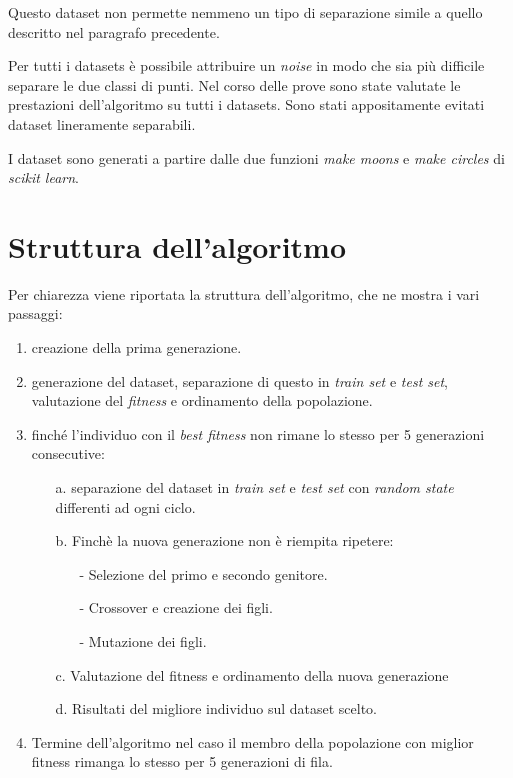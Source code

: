 \documentclass[12pt,a4paper]{report}
\begin{document}
Questo dataset non permette nemmeno un tipo di separazione simile a quello descritto nel paragrafo precedente.

Per tutti i datasets è possibile attribuire un \textit{noise} in modo che sia più difficile separare le due classi di punti.
Nel corso delle prove sono state valutate le prestazioni dell'algoritmo su tutti i datasets.
Sono stati appositamente evitati dataset lineramente separabili.

I dataset sono generati a partire dalle due funzioni \textit{make moons} e \textit{make circles} di \textit{scikit learn}.


\section{Struttura dell'algoritmo }

Per chiarezza viene riportata la struttura dell'algoritmo, che ne mostra i vari passaggi:

\begin{enumerate}
 \item creazione della prima generazione.
 \item generazione del dataset, separazione di questo in \textit{train set} e \textit{test set}, valutazione del \textit{fitness} e ordinamento della popolazione.
 \item finché l'individuo con il \textit{best fitness} non rimane lo stesso per 5 generazioni consecutive:
 \begin{enumerate}
  \item[a.] separazione del dataset in \textit{train set} e \textit{test set} con \textit{random state} differenti ad ogni ciclo.
  \item[b.] Finchè la nuova generazione non è riempita ripetere:
  \begin{enumerate}
   \item [-] Selezione del primo e secondo genitore.
   \item [-] Crossover e creazione dei figli.
   \item [-] Mutazione dei figli.
  \end{enumerate}
  \item [c.] Valutazione del fitness e ordinamento della nuova generazione
  \item [d.] Risultati del migliore individuo sul dataset scelto.
 \end{enumerate}
 \item Termine dell'algoritmo nel caso il membro della popolazione con miglior fitness rimanga lo stesso per 5 generazioni di fila.
\end{enumerate}
\end{document}
